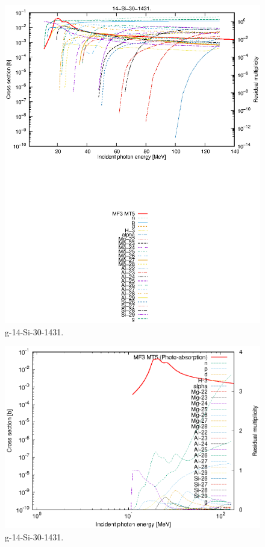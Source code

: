\begin{figure}
 \includegraphics[width=\linewidth]{eps/g_14-Si-30_1431.eps}
  \caption{g-14-Si-30-1431.}
\end{figure}
\newpage \clearpage

\begin{figure}
 \includegraphics[width=\linewidth]{eps-log/g_14-Si-30_1431.eps}
 \caption{g-14-Si-30-1431.}
\end{figure}
\newpage \clearpage

